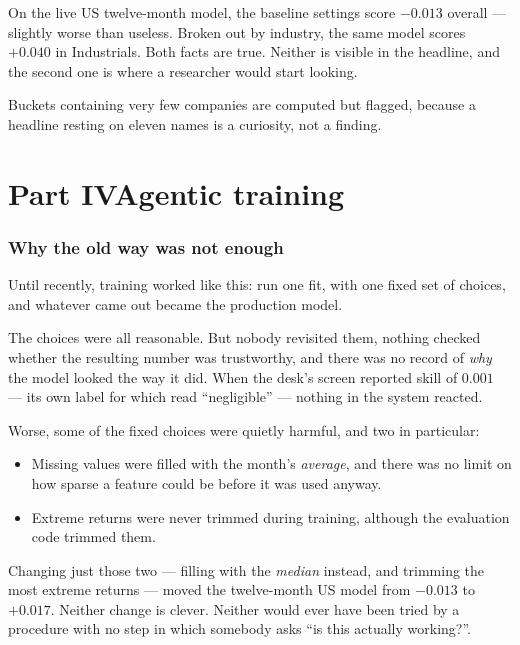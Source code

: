 \documentclass[11pt]{article}
\begin{document}
\begin{keybox}
On the live US twelve-month model, the baseline settings score $-0.013$ overall ---
slightly worse than useless. Broken out by industry, the same model scores $+0.040$ in
Industrials. Both facts are true. Neither is visible in the headline, and the second
one is where a researcher would start looking.
\end{keybox}

Buckets containing very few companies are computed but flagged, because a headline
resting on eleven names is a curiosity, not a finding.

\part*{Part IV\quad Agentic training}

\section{Why the old way was not enough}

Until recently, training worked like this: run one fit, with one fixed set of choices,
and whatever came out became the production model.

The choices were all reasonable. But nobody revisited them, nothing checked whether the
resulting number was trustworthy, and there was no record of \emph{why} the model
looked the way it did. When the desk's screen reported skill of $0.001$ --- its own
label for which read ``negligible'' --- nothing in the system reacted.

Worse, some of the fixed choices were quietly harmful, and two in particular:

\begin{itemize}
  \item Missing values were filled with the month's \emph{average}, and there was no
        limit on how sparse a feature could be before it was used anyway.
  \item Extreme returns were never trimmed during training, although the evaluation
        code trimmed them.
\end{itemize}

Changing just those two --- filling with the \emph{median} instead, and trimming the
most extreme returns --- moved the twelve-month US model from $-0.013$ to $+0.017$.
Neither change is clever. Neither would ever have been tried by a procedure with no
step in which somebody asks ``is this actually working?''.
\end{document}
